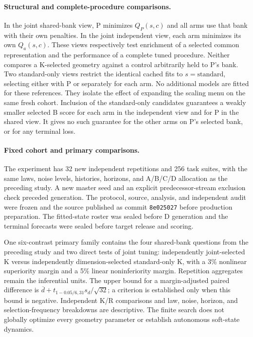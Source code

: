 \paragraph{Structural and complete-procedure comparisons.}
In the joint shared-bank view, P minimizes $Q_P(s,c)$ and all arms
use that bank with their own penalties. In the joint independent
view, each arm minimizes its own $Q_a(s,c)$. These views respectively
test enrichment of a selected common representation and the
performance of a complete tuned procedure. Neither compares a
K-selected geometry against a control arbitrarily held to P's bank.
Two standard-only views restrict the identical cached fits to
$s=\text{standard}$, selecting either with P or separately for each
arm. No additional models are fitted for these references. They
isolate the effect of expanding the scaling menu on the same fresh
cohort. Inclusion of the standard-only candidates guarantees a
weakly smaller selected B score for each arm in the independent
view and for P in the shared view. It gives no such guarantee for
the other arms on P's selected bank, or for any terminal loss.

\paragraph{Fixed cohort and primary comparisons.}
The experiment has 32 new independent repetitions and 256 task suites,
with the same laws, noise levels, histories, horizons, and A/B/C/D
allocation as the preceding study. A new master seed and an explicit
predecessor-stream exclusion check preceded generation. The protocol,
source, analysis, and independent audit were frozen and the source
published as commit \texttt{8e025027} before production preparation.
The fitted-state roster was sealed before D generation and the
terminal forecasts were sealed before target release and scoring.

One six-contrast primary family contains the four shared-bank
questions from the preceding study and two direct tests of joint
tuning: independently joint-selected K versus independently
dimension-selected standard-only K, with a 3\% nonlinear superiority
margin and a 5\% linear noninferiority margin. Repetition aggregates
remain the inferential units. The upper bound for a margin-adjusted
paired difference is
$\overline d+t_{1-0.05/6,31}s_d/\sqrt{32}$; a criterion is established
only when this bound is negative. Independent K/R comparisons and
law, noise, horizon, and selection-frequency breakdowns are
descriptive. The finite search does not globally optimize every
geometry parameter or establish autonomous soft-state dynamics.

